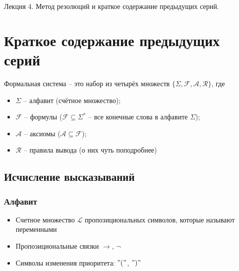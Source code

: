 \documentclass[11pt]{article}
\begin{document}
\begin{titlepage}
    \centering
    \vspace*{\fill}  %

    {\Huge Лекция 4. Метод резолюций и краткое содержание предыдущих серий.
    \par}

    \vspace*{\fill}  %
\end{titlepage}

\setcounter{page}{1}

\section{Краткое содержание предыдущих серий}

\begin{definition}
    Формальная система -- это набор из четырёх множеств $\{\Sigma, \mathcal{F}, 
    \mathcal{A}, \mathcal{R}\}$, где \begin{itemize}
        \item $\Sigma$ -- алфавит (счётное множество);
        \item $\mathcal{F}$ -- формулы ($\mathcal{F} \subseteq \Sigma^*$ -- все 
        конечные слова в алфавите $\Sigma$);
        \item $\mathcal{A}$ -- аксиомы ($\mathcal{A} \subseteq \mathcal{F}$);
        \item $\mathcal{R}$ -- правила вывода (о них чуть поподробнее)
    \end{itemize}
\end{definition}

\subsection{Исчисление высказываний}

\subsubsection*{Алфавит}

\begin{itemize}
    \item Счетное множество $\mathcal{L}$ пропозициональных символов, которые 
    называют переменными
    \item Пропозициональные связки $\rightarrow$, $\lnot$ 
    \item Символы изменения приоритета: $"("$, $")"$
\end{itemize}
\end{document}
